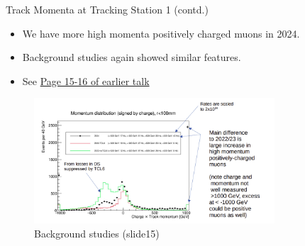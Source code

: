 \begin{frame}{Track Momenta at Tracking Station 1 (contd.)}
	\begin{itemize}
		\item We have more high momenta positively charged muons in 2024.
		\item Background studies again showed similar features.
		\item See \href{https://indico.cern.ch/event/1350790/contributions/5686387/attachments/2836819/4957405/Introduction.pdf}{Page 15-16 of earlier talk} 
	\end{itemize}
	\begin{figure}
		\centering
		\includegraphics[width=0.8\textwidth]{slide15.png}
		\caption{Background studies (slide15)}
	\end{figure}
\end{frame}